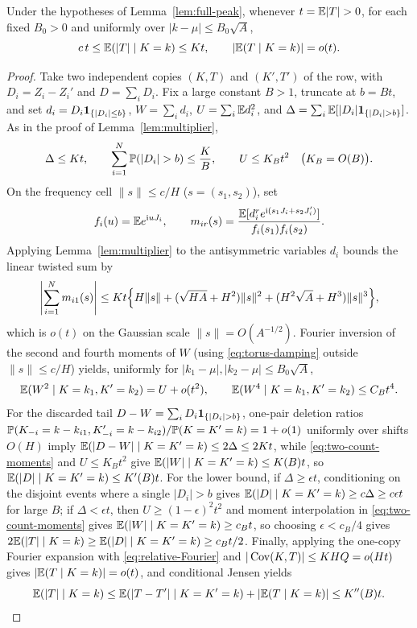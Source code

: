 \begin{lemma}\label{lem:conditional-relative}
Under the hypotheses of Lemma~\ref{lem:full-peak}, whenever $t=\E|T|>0$, for
each fixed $B_0>0$ and uniformly over $|k-\mu|\le B_0\sqrt A$,
\begin{equation}\label{eq:conditional-relative}
 c\,t\le\mathbb E(|T|\mid K=k)\le Kt,\qquad
                      |\mathbb E(T\mid K=k)|=o(t).
\end{equation}
\end{lemma}
\begin{proof}
Take two independent copies $(K,T)$ and $(K',T')$ of the row, with
$D_i=Z_i-Z_i'$ and $D=\sum_i D_i$. Fix a large constant $B>1$, truncate at
$b=Bt$, and set $d_i=D_i\mathbf1_{\{|D_i|\le b\}}$, $W=\sum_i d_i$,
$U=\sum_i\mathbb E d_i^2$, and $\Delta=\sum_i\E[|D_i|\ind_{\{|D_i|>b\}}]$. As in the
proof of Lemma~\ref{lem:multiplier},
\begin{equation}\label{eq:two-copy-truncation}
 \Delta\le Kt,\qquad \sum_{i=1}^N\Pp(|D_i|>b)\le \frac KB,\qquad
                      U\le K_Bt^2\quad\bigl(K_B=O(B)\bigr).
\end{equation}
On the frequency cell $\|s\|\le c/H$ ($s=(s_1,s_2)$), set
\[
 f_i(u)=\mathbb E e^{\mathrm i uJ_i},\qquad
 m_{ir}(s)=\frac{\mathbb E[d_i^re^{\mathrm i(s_1J_i+s_2J_i')}]}{f_i(s_1)f_i(s_2)}.
\]
Applying
Lemma~\ref{lem:multiplier} to the antisymmetric variables $d_i$ bounds the
linear twisted sum by
\begin{equation}\label{eq:relative-Fourier}
 \left|\sum_{i=1}^N m_{i1}(s)\right|\le Kt\Bigl\{H\|s\|
  +(\sqrt{HA}+H^2)\|s\|^2+(H^2\sqrt A+H^3)\|s\|^3\Bigr\},
\end{equation}
which is $o(t)$ on the Gaussian scale $\|s\|=O(A^{-1/2})$. Fourier inversion
of the second and fourth moments of $W$ (using \eqref{eq:torus-damping}
outside $\|s\|\le c/H$) yields, uniformly for $|k_1-\mu|,|k_2-\mu|\le B_0\sqrt A$,
\begin{equation}\label{eq:two-count-moments}
 \mathbb E(W^2\mid K=k_1,K'=k_2)=U+o(t^2),\qquad
 \mathbb E(W^4\mid K=k_1,K'=k_2)\le C_Bt^4.
\end{equation}
For the discarded tail $D-W=\sum_i D_i\ind_{\{|D_i|>b\}}$, one-pair deletion
ratios $\mathbb P(K_{-i}=k-k_{i1},K'_{-i}=k-k_{i2})/\mathbb P(K=K'=k)=1+o(1)$ uniformly
over shifts $O(H)$ imply $\mathbb E(|D-W|\mid K=K'=k)\le2\Delta\le2Kt$, while
\eqref{eq:two-count-moments} and $U\le K_Bt^2$ give
$\mathbb E(|W|\mid K=K'=k)\le K(B)t$, so $\mathbb E(|D|\mid K=K'=k)\le K'(B)t$. For the
lower bound, if $\Delta\ge\epsilon t$, conditioning on the disjoint events
where a single $|D_i|>b$ gives $\mathbb E(|D|\mid K=K'=k)\ge c\Delta\ge c\epsilon t$
for large $B$; if $\Delta<\epsilon t$, then $U\ge(1-\epsilon)^2t^2$ and
moment interpolation in \eqref{eq:two-count-moments} gives
$\mathbb E(|W|\mid K=K'=k)\ge c_Bt$, so choosing $\epsilon<c_B/4$ gives
$2\mathbb E(|T|\mid K=k)\ge\mathbb E(|D|\mid K=K'=k)\ge c_Bt/2$. Finally, applying the
one-copy Fourier expansion with \eqref{eq:relative-Fourier} and
$|\operatorname{Cov}(K,T)|\le KHQ=o(Ht)$ gives $|\mathbb E(T\mid K=k)|=o(t)$, and conditional
Jensen yields
\[
 \mathbb E(|T|\mid K=k)\le\mathbb E(|T-T'|\mid K=K'=k)+|\mathbb E(T\mid K=k)|\le K''(B)t.
\]
\end{proof}

